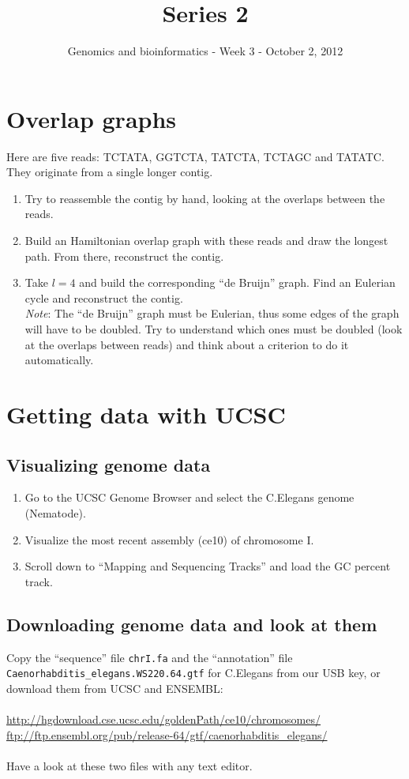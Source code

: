 \documentclass[a4paper,11pt]{article}
\title{Series 2}
\date{}
\author{Genomics and bioinformatics - Week 3 - October 2, 2012}
\begin{document}
\maketitle

\section{Overlap graphs}
Here are five reads: TCTATA, GGTCTA, TATCTA, TCTAGC and TATATC. They originate from a single longer contig.
\begin{enumerate}
\item Try to reassemble the contig by hand, looking at the overlaps between the reads.
\item Build an Hamiltonian overlap graph with these reads and draw the longest path.
From there, reconstruct the contig.
\item Take $l=4$ and build the corresponding ``de Bruijn'' graph. Find an Eulerian cycle and reconstruct the contig. \\
\textit{Note}: The ``de Bruijn'' graph must be Eulerian, thus some edges of the graph will have to be doubled.
Try to understand which ones must be doubled (look at the overlaps between reads) and think about a criterion to do it automatically.
\end{enumerate}

\section{Getting data with UCSC}
\subsection{Visualizing genome data}
\begin{enumerate}
\item Go to the UCSC Genome Browser and select the C.Elegans genome (Nematode).
\item Visualize the most recent assembly (ce10) of chromosome I.
\item Scroll down to ``Mapping and Sequencing Tracks'' and load the GC percent track.
\end{enumerate}

\subsection{Downloading genome data and look at them}
Copy the ``sequence'' file \texttt{chrI.fa} and the ``annotation'' file \texttt{Caenorhabditis\_elegans.WS220.64.gtf} for C.Elegans from our USB key, or download them from UCSC and ENSEMBL: \\\\
\url{http://hgdownload.cse.ucsc.edu/goldenPath/ce10/chromosomes/}\\
\url{ftp://ftp.ensembl.org/pub/release-64/gtf/caenorhabditis\_elegans/}\\\\
Have a look at these two files with any text editor.
\end{document}
